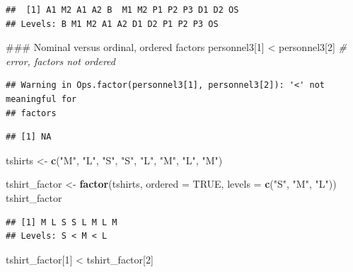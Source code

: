 \documentclass[]{book}
\newenvironment{Shaded}{\begin{snugshade}}{\end{snugshade}}
\newcommand{\KeywordTok}[1]{\textcolor[rgb]{0.13,0.29,0.53}{\textbf{{#1}}}}
\newcommand{\DataTypeTok}[1]{\textcolor[rgb]{0.13,0.29,0.53}{{#1}}}
\newcommand{\DecValTok}[1]{\textcolor[rgb]{0.00,0.00,0.81}{{#1}}}
\newcommand{\StringTok}[1]{\textcolor[rgb]{0.31,0.60,0.02}{{#1}}}
\newcommand{\CommentTok}[1]{\textcolor[rgb]{0.56,0.35,0.01}{\textit{{#1}}}}
\newcommand{\OtherTok}[1]{\textcolor[rgb]{0.56,0.35,0.01}{{#1}}}
\newcommand{\NormalTok}[1]{{#1}}
\begin{document}
\begin{verbatim}
##  [1] A1 M2 A1 A2 B  M1 M2 P1 P2 P3 D1 D2 OS
## Levels: B M1 M2 A1 A2 D1 D2 P1 P2 P3 OS
\end{verbatim}

\begin{Shaded}
\begin{Highlighting}[]
\NormalTok{### Nominal versus ordinal, ordered factors}
\NormalTok{personnel3[}\DecValTok{1}\NormalTok{] <}\StringTok{ }\NormalTok{personnel3[}\DecValTok{2}\NormalTok{]  }\CommentTok{# error, factors not ordered}
\end{Highlighting}
\end{Shaded}

\begin{verbatim}
## Warning in Ops.factor(personnel3[1], personnel3[2]): '<' not meaningful for
## factors
\end{verbatim}

\begin{verbatim}
## [1] NA
\end{verbatim}

\begin{Shaded}
\begin{Highlighting}[]
\NormalTok{tshirts <-}\StringTok{ }\KeywordTok{c}\NormalTok{(}\StringTok{"M"}\NormalTok{, }\StringTok{"L"}\NormalTok{, }\StringTok{"S"}\NormalTok{, }\StringTok{"S"}\NormalTok{, }\StringTok{"L"}\NormalTok{, }\StringTok{"M"}\NormalTok{, }\StringTok{"L"}\NormalTok{, }\StringTok{"M"}\NormalTok{)}

\NormalTok{tshirt_factor <-}\StringTok{ }\KeywordTok{factor}\NormalTok{(tshirts, }\DataTypeTok{ordered =} \OtherTok{TRUE}\NormalTok{,}
                        \DataTypeTok{levels =} \KeywordTok{c}\NormalTok{(}\StringTok{"S"}\NormalTok{, }\StringTok{"M"}\NormalTok{, }\StringTok{"L"}\NormalTok{))}
\NormalTok{tshirt_factor}
\end{Highlighting}
\end{Shaded}

\begin{verbatim}
## [1] M L S S L M L M
## Levels: S < M < L
\end{verbatim}

\begin{Shaded}
\begin{Highlighting}[]
\NormalTok{tshirt_factor[}\DecValTok{1}\NormalTok{] <}\StringTok{ }\NormalTok{tshirt_factor[}\DecValTok{2}\NormalTok{]}
\end{Highlighting}
\end{Shaded}
\end{document}

